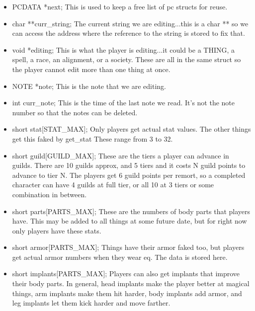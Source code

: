 \begin{itemize}
	

\item  PCDATA *next;             This is used to keep a free list of
pc structs for reuse.     

\item  char **curr\_string;            The current string we are
editing...this is a char ** so we can access the address where the
reference to the string is stored to fix that. 

\item  void *editing;                This is what the player is
editing...it could be a THING, a spell, a race, an alignment, or a
society. These are all in the same struct so the player cannot edit
more than one thing at once.

\item  NOTE *note;                This is the note that we are
editing.
 
\item  int curr\_note;            This is the time of the last note we
read. It's not the note number so that the notes can be deleted. 

\item  short stat[STAT\_MAX];         Only players get actual stat
  values. The other things get this faked by get\_stat These range
  from 3 to 32.

\item  short guild[GUILD\_MAX];       These are the tiers a player can
  advance in guilds. There are 10 guilds approx, and 5 tiers and it
  costs N guild points to advance to tier N. The players get 6 guild
  points per remort, so a completed character can have 4 guilds at
  full tier, or all 10 at 3 tiers or some combination in between.

\item short parts[PARTS\_MAX];       These are the numbers of body parts
  that players have. This may be added to all things at some future
  date, but for right now only players have these stats.

 \item  short armor[PARTS\_MAX];      Things have their armor faked too, but
  players get actual armor numbers when they wear eq. The data is
  stored here.

\item  short implants[PARTS\_MAX];    Players can also get implants that
  improve their body parts. In general, head implants make the player
  better at magical things, arm implants make them hit harder, body
  implants add armor, and leg implants let them kick harder and move farther.


\end{itemize}
